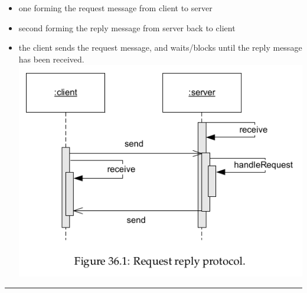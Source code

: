 \documentclass[11pt]{article}
\makeatletter
\def\maxwidth{\ifdim\Gin@nat@width>\linewidth\linewidth
    \else\Gin@nat@width\fi}
\let\Oldincludegraphics\includegraphics
\renewcommand{\includegraphics}[1]{\Oldincludegraphics[width=.8\maxwidth]{#1}}
\providecommand{\tightlist}{%
      \setlength{\itemsep}{0pt}\setlength{\parskip}{0pt}}
\makeatother
\begin{document}
\begin{itemize}
  \begin{itemize}
  \tightlist
  \item
    one forming the request message from client to server
  \item
    second forming the reply message from server back to client
  \item
    the client sends the request message, and waits/blocks until the
    reply message has been received.
    \includegraphics{img/request_reply.png}
  \end{itemize}
\end{itemize}

\begin{center}\rule{0.5\linewidth}{\linethickness}\end{center}
\end{document}
